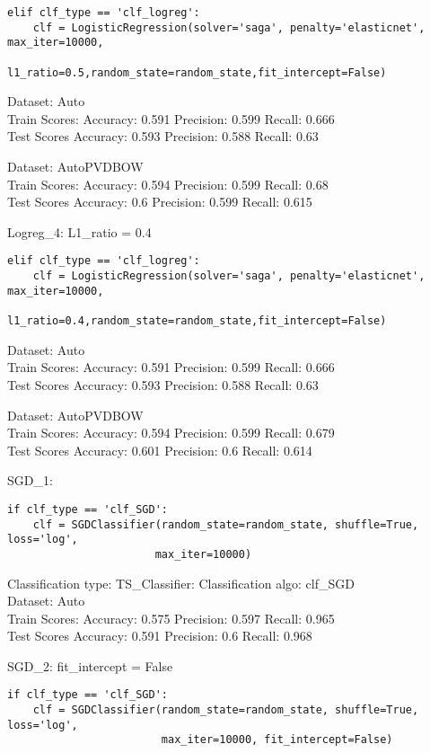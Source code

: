 \documentclass[11pt,preprint, authoryear]{elsarticle}
\numberwithin{equation}{section}
\numberwithin{figure}{section}
\numberwithin{table}{section}
\begin{document}
\begin{verbatim}
elif clf_type == 'clf_logreg':
    clf = LogisticRegression(solver='saga', penalty='elasticnet', max_iter=10000,
                      l1_ratio=0.5,random_state=random_state,fit_intercept=False)
\end{verbatim}

Dataset: Auto\\
Train Scores: Accuracy: 0.591 Precision: 0.599 Recall: 0.666\\
Test Scores Accuracy: 0.593 Precision: 0.588 Recall: 0.63

Dataset: AutoPVDBOW\\
Train Scores: Accuracy: 0.594 Precision: 0.599 Recall: 0.68\\
Test Scores Accuracy: 0.6 Precision: 0.599 Recall: 0.615

Logreg\_4: L1\_ratio = 0.4

\begin{verbatim}
elif clf_type == 'clf_logreg':
    clf = LogisticRegression(solver='saga', penalty='elasticnet', max_iter=10000,
                      l1_ratio=0.4,random_state=random_state,fit_intercept=False)
\end{verbatim}

Dataset: Auto\\
Train Scores: Accuracy: 0.591 Precision: 0.599 Recall: 0.666\\
Test Scores Accuracy: 0.593 Precision: 0.588 Recall: 0.63

Dataset: AutoPVDBOW\\
Train Scores: Accuracy: 0.594 Precision: 0.599 Recall: 0.679\\
Test Scores Accuracy: 0.601 Precision: 0.6 Recall: 0.614

SGD\_1:

\begin{verbatim}
if clf_type == 'clf_SGD':
    clf = SGDClassifier(random_state=random_state, shuffle=True, loss='log', 
                       max_iter=10000)
\end{verbatim}

Classification type: TS\_Classifier: Classification algo: clf\_SGD\\
Dataset: Auto\\
Train Scores: Accuracy: 0.575 Precision: 0.597 Recall: 0.965\\
Test Scores Accuracy: 0.591 Precision: 0.6 Recall: 0.968

SGD\_2: fit\_intercept = False

\begin{verbatim}
if clf_type == 'clf_SGD':
    clf = SGDClassifier(random_state=random_state, shuffle=True, loss='log', 
                        max_iter=10000, fit_intercept=False)
\end{verbatim}
\end{document}
